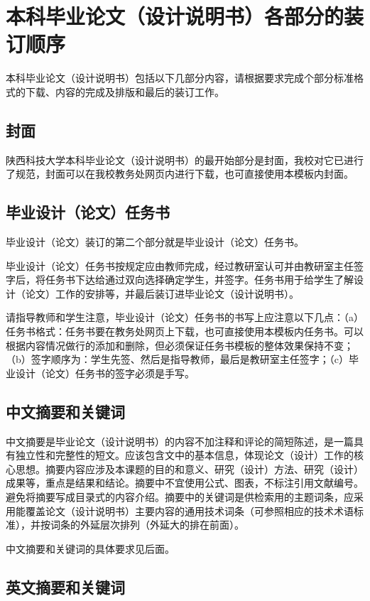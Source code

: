 \chapter{本科毕业论文（设计说明书）各部分的装订顺序}

本科毕业论文（设计说明书）包括以下几部分内容，请根据要求完成个部分标准格式的下载、内容的完成及排版和最后的装订工作。
\section{封面}
陕西科技大学本科毕业论文（设计说明书）的最开始部分是封面，我校对它已进行了规范，封面可以在我校教务处网页内进行下载，也可直接使用本模板内封面。

\section{毕业设计（论文）任务书}

毕业设计（论文）装订的第二个部分就是毕业设计（论文）任务书。

毕业设计（论文）任务书按规定应由教师完成，经过教研室认可并由教研室主任签字后，将任务书下达给通过双向选择确定学生，并签字。任务书用于给学生了解设计（论文）工作的安排等，并最后装订进毕业论文（设计说明书）。

请指导教师和学生注意，毕业设计（论文）任务书的书写上应注意以下几点：（a）任务书格式：任务书要在教务处网页上下载，也可直接使用本模板内任务书。可以根据内容情况做行的添加和删除，但必须保证任务书模板的整体效果保持不变；（b）签字顺序为：学生先签、然后是指导教师，最后是教研室主任签字；（c）毕业设计（论文）任务书的签字必须是手写。
\section{中文摘要和关键词}

中文摘要是毕业论文（设计说明书）的内容不加注释和评论的简短陈述，是一篇具有独立性和完整性的短文。应该包含文中的基本信息，体现论文（设计）工作的核心思想。摘要内容应涉及本课题的目的和意义、研究（设计）方法、研究（设计）成果等，重点是结果和结论。摘要中不宜使用公式、图表，不标注引用文献编号。避免将摘要写成目录式的内容介绍。摘要中的关键词是供检索用的主题词条，应采用能覆盖论文（设计说明书）主要内容的通用技术词条（可参照相应的技术术语标准），并按词条的外延层次排列（外延大的排在前面）。

中文摘要和关键词的具体要求见后面。

\section{英文摘要和关键词}

